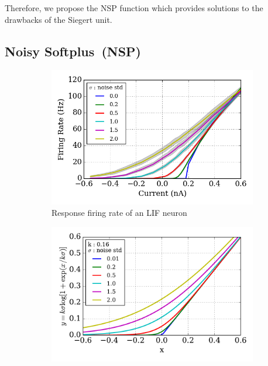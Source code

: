 	Therefore, we propose the NSP function which provides solutions to the drawbacks of the Siegert unit.

		
	\subsection{Noisy Softplus~(NSP)}
	\label{sec:NSP}
	\DIFdelbegin %

\DIFdelendFL \DIFaddbeginFL \begin{figure}[bht!]
		\DIFaddendFL \centering
		\begin{subfigure}[t]{0.48\textwidth}
			\DIFdelbeginFL %
\DIFdelendFL \DIFaddbeginFL \includegraphics[width=\textwidth]{pics_iconip/revise_siegert.png}
			\DIFaddendFL \caption{Response firing rate of an LIF neuron}
		\end{subfigure}
		\begin{subfigure}[t]{0.48\textwidth}
			\DIFdelbeginFL %
\DIFdelendFL \DIFaddbeginFL \includegraphics[width=\textwidth]{pics_iconip/revise_4.pdf}

\end{subfigure}
\end{figure}
